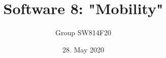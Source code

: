 \title{Software 8: "Mobility"}                                                    %
\date{28. May 2020}                                                          %
\def\groupnumber{Group SW814F20}                                                  %
\author{\groupnumber}                                                             %

\let\theauthor\author
\let\thedate\date


